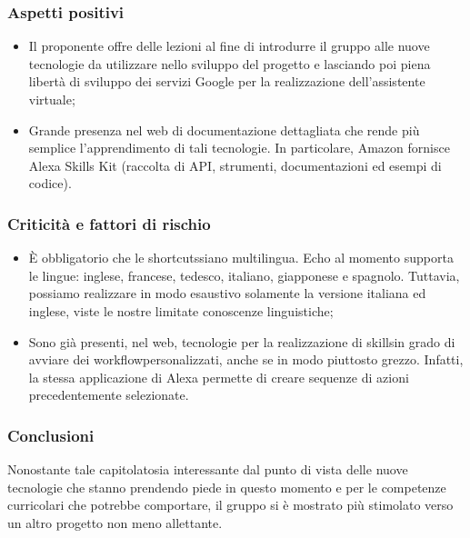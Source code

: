 \subsubsection{Aspetti positivi}
\begin{itemize}
	\item Il proponente offre delle lezioni al fine di introdurre il gruppo alle nuove tecnologie da utilizzare nello sviluppo del progetto e lasciando poi piena libertà di sviluppo dei servizi Google per la realizzazione dell’assistente virtuale;
	\item Grande presenza nel web di documentazione dettagliata che rende più semplice l’apprendimento di tali tecnologie. In particolare, Amazon fornisce Alexa Skills Kit (raccolta di API\glo, strumenti, documentazioni ed esempi di codice).
\end{itemize}
\subsubsection{Criticità e fattori di rischio}
\begin{itemize}
	\item È obbligatorio che le shortcuts\glo siano multilingua. Echo al momento supporta le lingue: inglese, francese, tedesco, 			italiano, giapponese e spagnolo. Tuttavia, possiamo realizzare in modo esaustivo solamente la versione italiana ed inglese, 			viste le nostre limitate conoscenze linguistiche;
	\item Sono già presenti, nel web, tecnologie per la realizzazione di skills\glo in grado di avviare dei workflow\glo personalizzati, anche se in modo piuttosto grezzo. Infatti, la stessa applicazione di Alexa permette di creare sequenze di azioni precedentemente selezionate.
\end{itemize}
\subsubsection{Conclusioni}
Nonostante tale capitolato\glo sia interessante dal punto di vista delle nuove tecnologie che stanno prendendo piede in questo momento e per le competenze curricolari che potrebbe comportare, il gruppo si è mostrato più stimolato verso un altro progetto non meno allettante.